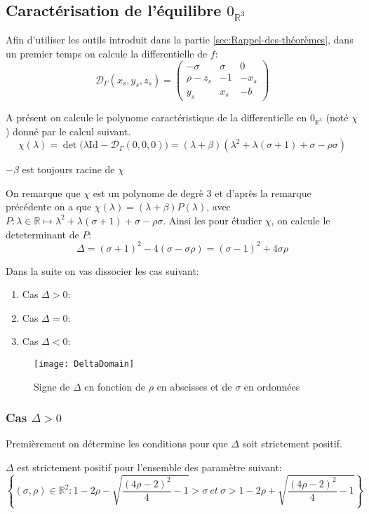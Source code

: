 \documentclass{article}
\newcommand{\R}{\mathbb{R}}
\newcommand{\id}[1][]{\ensuremath{\mathrm{Id}_{#1}}}
\newtheorem[M , nocut]{prop}{Proposition}[section]
\newtheorem[M]{propt}{Propriété}[section]
\newtheorem[L , nocut]{thm}{Théoreme}
\newtheorem[L]{cor}{Corollaire}
\begin{document}
\subsection{Caractérisation de l'équilibre $0_{\R^3}$}
Afin d'utiliser les outils introduit dans la partie \ref{sec:Rappel-des-théorèmes}, dans un premier temps on calcule la differentielle de $f$:
\begin{equation}
    \label{eq:diff}
    \mathcal{D}_\Gamma(x_s,y_s,z_s) = 
    \left(\begin{array}{ccc}
        -\sigma & \sigma & 0\\
        \rho- z_s & -1 & -x_s\\
        y_s & x_s & -b
    \end{array}\right)
\end{equation}

A présent on calcule le polynome caractéristique de la differentielle en $0_{\R^3}$ (noté $\chi$) donné par le calcul suivant.
\[
    \chi (\lambda) = \det\big(\lambda\id - \mathcal{D}_{\Gamma}(0,0,0)\big) = (\lambda + \beta)(\lambda^2 + \lambda(\sigma+1)+\sigma-\rho\sigma)
\]
\begin{example}[Remarque]
    $-\beta$ est toujours racine de $\chi$
\end{example}
On remarque que $\chi$ est un polynome de degrè 3 et d'après la remarque précédente on a que $\chi(\lambda) = (\lambda + \beta)P(\lambda)$, avec $P:\lambda \in \R \mapsto \lambda^2 + \lambda(\sigma+1)+\sigma-\rho\sigma$. Ainsi les pour étudier $\chi$, on calcule le deteterminant de $P$:
\[
  \Delta = (\sigma+1)^2 - 4(\sigma-\sigma\rho) = (\sigma-1)^2 +4\sigma\rho
\]

Dans la suite on vas dissocier les cas suivant:
\begin{enumerate}
    \item Cas $\Delta > 0$:
    \item Cas $\Delta = 0$:
    \item Cas $\Delta < 0$:
\end{enumerate}
\begin{figure}[ht]
    \centering
    \texttt{[image: DeltaDomain]}
    \caption{Signe de $\Delta$ en fonction de $\rho$ en abscisses et de $\sigma$ en ordonnées}
    \label{fig:signD}
\end{figure}


\subsubsection*{Cas $\Delta > 0$}
Premièrement on détermine les conditions pour que $\Delta$ soit strictement positif.
\begin{prop}
    $\Delta$ est strictement positif pour l'ensemble des paramètre suivant:
    \[
     \left\{(\sigma,\rho)\in \R ^2 : 1-2 \rho - \sqrt{\frac{(4\rho-2)^2}{4} -1 } > \sigma\ et \ \sigma > 1-2 \rho + \sqrt{ \frac{(4\rho-2)^2}{4} -1  } \right\}    
    \]
\end{prop}
\end{document}
